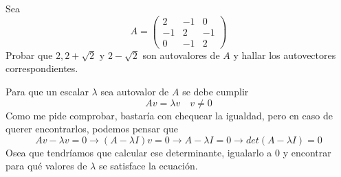 \item Sea \[A=\begin{pmatrix}
        2&-1&0\\-1&2&-1\\0&-1&2
    \end{pmatrix}\]Probar que $2,2+\sqrt{2}$ y $2-\sqrt{2}$ son autovalores de $A$ y hallar los autovectores correspondientes.
    \begin{mdframed}[style=s]
        Para que un escalar $\lambda$ sea autovalor de $A$ se debe cumplir\[Av=\lambda v\quad v\neq 0\]
        Como me pide comprobar, bastaría con chequear la igualdad, pero en caso de querer encontrarlos, podemos pensar que\[Av-\lambda v=0\to (A-\lambda I)v=0\to A-\lambda I=0\to det(A-\lambda I)=0\]
        Osea que tendríamos que calcular ese determinante, igualarlo a 0 y encontrar para qué valores de $\lambda$ se satisface la ecuación.
\end{mdframed}
